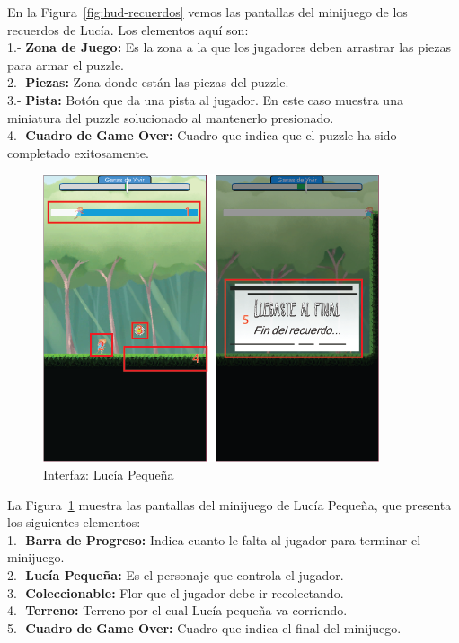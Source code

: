 En la Figura~\ref{fig:hud-recuerdos} vemos las pantallas del minijuego de los recuerdos de Lucía. Los elementos aquí son:\\
1.- \textbf{Zona de Juego:} Es la zona a la que los jugadores deben arrastrar las piezas para armar el puzzle.\\
2.- \textbf{Piezas:} Zona donde están las piezas del puzzle.\\
3.- \textbf{Pista:} Botón que da una pista al jugador. En este caso muestra una miniatura del puzzle solucionado al mantenerlo presionado.\\
4.- \textbf{Cuadro de Game Over:} Cuadro que indica que el puzzle ha sido completado exitosamente.

\newpage
\begin{figure}[ht]
    \centering
    \includegraphics{imgs/hud-pequena.png}
    \caption{Interfaz: Lucía Pequeña}
    \label{fig:hud-pequena}
\end{figure}

La Figura~\ref{fig:hud-pequena} muestra las pantallas del minijuego de Lucía Pequeña, que presenta los siguientes elementos:\\
1.- \textbf{Barra de Progreso:} Indica cuanto le falta al jugador para terminar el minijuego.\\
2.- \textbf{Lucía Pequeña:} Es el personaje que controla el jugador.\\
3.- \textbf{Coleccionable:} Flor que el jugador debe ir recolectando.\\
4.- \textbf{Terreno:} Terreno por el cual Lucía pequeña va corriendo.\\
5.- \textbf{Cuadro de Game Over:} Cuadro que indica el final del minijuego.

